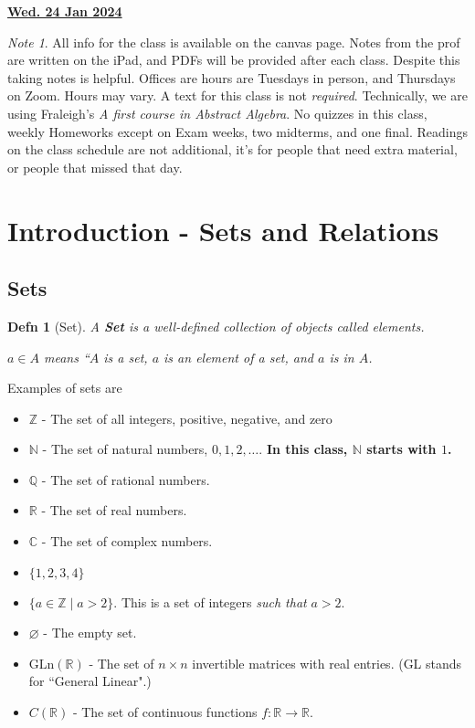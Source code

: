 \documentclass[12pt]{article}
\renewcommand{\date}[1]{\underline{\bf #1}}
\def\N{{\mathbb N}}
\def\Z{{\mathbb Z}}
\def\Q{{\mathbb Q}}
\def\R{{\mathbb R}}
\def\C{{\mathbb C}}
\newtheorem{definition}{Defn}
\theoremstyle{remark}
\theoremstyle{remark}
\theoremstyle{remark}
\theoremstyle{remark}
\theoremstyle{remark}
\newtheorem*{note}{Note}
\begin{document}
\tableofcontents

\date{Wed. 24 Jan 2024}

\begin{note}
  All info for the class is available on the canvas page. Notes from the prof
  are written on the iPad, and PDFs will be provided after each class. Despite
  this taking notes is helpful. Offices are hours are Tuesdays in person, and
  Thursdays on Zoom. Hours may vary. A text for this class is not {\it
  required}. Technically, we are using Fraleigh's {\it A first course in
  Abstract Algebra}. No quizzes in this class, weekly Homeworks except on Exam
  weeks, two midterms, and one final. Readings on the class schedule are not
  additional, it's for people that need extra material, or people that missed
  that day.
\end{note}

\section{Introduction - Sets and Relations}

\subsection{Sets}

\begin{definition}[Set]
	A {\bf Set} is a well-defined collection of objects called {\it elements}.

	$a \in A$ means ``$A$ is a set, $a$ is an element of a set, and $a$ is in
	$A$.
\end{definition}

Examples of sets are

\begin{itemize}
	\item $\Z$ - The set of all integers, positive, negative, and zero
	\item $\N$ - The set of natural numbers, $0, 1, 2, \dots$. {\bf In this
			      class, $\N$ starts with $1$.}
	\item $\Q$ - The set of rational numbers.
	\item $\R$ - The set of real numbers.
	\item $\C$ - The set of complex numbers.
	\item $\{1, 2, 3, 4\}$
	\item $\{a \in \Z \mid a > 2 \}$. This is a set of integers {\it such that} $a
		      > 2$.
	\item $\varnothing$ - The empty set.
	\item $\text{GLn}(\R)$ - The set of $n \times n$ invertible matrices with real
	      entries. (GL stands for ``General Linear".)
	\item $C(\R)$ - The set of continuous functions $f: \R \to \R$.
\end{itemize}
\end{document}

